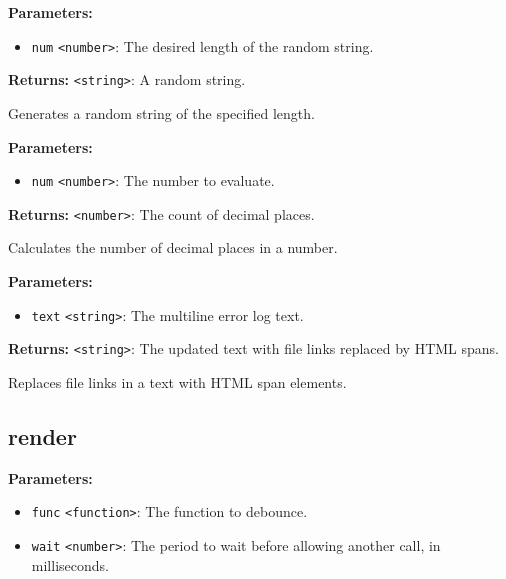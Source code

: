 \documentclass[12pt,a4paper]{article}
\begin{document}
\noindent \textbf{Parameters:}
\begin{itemize}
  \item \texttt{num} \texttt{<number>}: The desired length of the random string.
\end{itemize}

\noindent \textbf{Returns:} \texttt{<string>}: A random string.

\noindent Generates a random string of the specified length.

\vspace{5mm}
\noindent {}


\noindent \textbf{Parameters:}
\begin{itemize}
  \item \texttt{num} \texttt{<number>}: The number to evaluate.
\end{itemize}

\noindent \textbf{Returns:} \texttt{<number>}: The count of decimal places.

\noindent Calculates the number of decimal places in a number.

\vspace{5mm}
\noindent {}


\noindent \textbf{Parameters:}
\begin{itemize}
  \item \texttt{text} \texttt{<string>}: The multiline error log text.
\end{itemize}

\noindent \textbf{Returns:} \texttt{<string>}: The updated text with file links replaced by HTML spans.

\noindent Replaces file links in a text with HTML span elements.


\subsection{render}
\vspace{5mm}
\noindent {}


\noindent \textbf{Parameters:}
\begin{itemize}
  \item \texttt{func} \texttt{<function>}: The function to debounce.
  \item \texttt{wait} \texttt{<number>}: The period to wait before allowing another call, in milliseconds.
\end{itemize}
\end{document}
